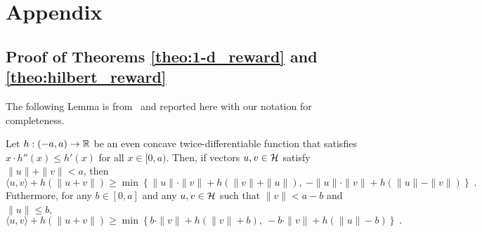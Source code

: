 \appendix
\section{Appendix}

\subsection{Proof of Theorems \ref{theo:1-d_reward} and \ref{theo:hilbert_reward}}

The following Lemma is from~\cite{McMahanO14} and reported here with our notation for completeness.
\begin{lemma}[Extremes]
\label{lemma:extremes}
Let $h:(-a,a) \to \mathbb{R}$ be an even concave twice-differentiable function that
satisfies $x \cdot h''(x) \le h'(x)$ for all $x \in [0,a)$. Then, if vectors
$u,v \in \mathcal{H}$ satisfy $\|u\| + \|v\| < a$, then
\begin{equation}
\label{equation:lemma-extremes-1}
\langle u, v \rangle + h(\|u + v\|) \ge \min \left\{ \|u\| \cdot \|v\| + h(\|v\| + \|u\|), \ - \|u\| \cdot \|v\| + h(\|u\| - \|v\|) \right\} \; .
\end{equation}
Futhermore, for any $b \in [0,a]$ and any $u, v \in \mathcal{H}$ such that $\|v\| < a - b$ and $\|u\| \le b$,
\begin{equation}
\label{equation:lemma-extremes-2}
\langle u, v \rangle + h(\|u + v\|) \ge \min \left\{ b \cdot \|v\| + h(\|v\| + b), \ - b \cdot \|v\| + h(\|u\| - b) \right\} \; .
\end{equation}
\end{lemma}

